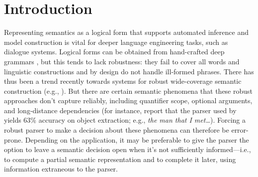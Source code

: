 \section{Introduction} \label{sec:intro}

Representing semantics as a logical form that supports automated
inference and model construction is vital for deeper language
engineering tasks, such as dialogue systems.  Logical forms
can be obtained from hand-crafted deep grammars
\cite{butt:etal:1999,copestake:flickinger:2000}, but this
tends to lack robustness: they fail to cover all
words and linguistic constructions and by design do not handle
ill-formed phrases. 
There has thus been a trend recently towards systems for
robust wide-coverage semantic construction (e.g., 
\cite{bos:etal:2004,zettlemoyer:collins:2007}).     
% 
But there are certain semantic phenomena that these robust
approaches don't capture reliably, including quantifier scope,
optional arguments, and long-distance dependencies (for instance,
 report that the parser used by
 yields 63\% accuracy on object
extraction; e.g., {\em the man that I met\dots}).  Forcing a robust
parser to make a decision about these phenomena can therefore be
error-prone.  Depending on the application, it may be preferable to
give the parser the option to leave a semantic decision open when it's not
sufficiently informed---i.e., to compute a partial semantic
representation and to complete it later, using information
extraneous to the parser.

